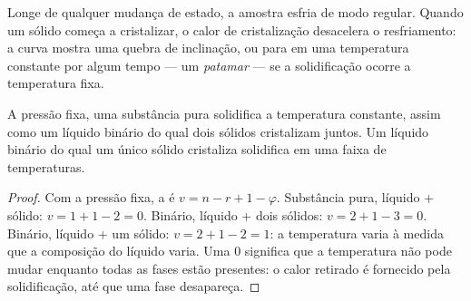 Longe de qualquer mudança de estado, a amostra esfria de modo regular. Quando
um sólido começa a cristalizar, o calor de cristalização desacelera o
resfriamento: a curva mostra uma quebra de inclinação, ou para em uma
temperatura constante por algum tempo --- um \textit{patamar} --- se a
solidificação ocorre a temperatura fixa.

\begin{proposition}[Patamares]\label{prop:b2:solid-liquid-diagrams:plateaus}
A pressão fixa, uma substância pura solidifica a temperatura constante, assim
como um líquido binário do qual dois sólidos cristalizam juntos. Um líquido
binário do qual um único sólido cristaliza solidifica em uma faixa de
temperaturas.
\end{proposition}

\begin{proof}
Com a pressão fixa, a  é $v = n - r + 1 - \varphi$. Substância
pura, líquido + sólido: $v = 1 + 1 - 2 = 0$. Binário, líquido + dois sólidos:
$v = 2 + 1 - 3 = 0$. Binário, líquido + um sólido: $v = 2 + 1 - 2 = 1$: a
temperatura varia à medida que a composição do líquido varia. Uma  0
significa que a temperatura não pode mudar enquanto todas as fases estão
presentes: o calor retirado é fornecido pela solidificação, até que uma fase
desapareça.
\end{proof}

